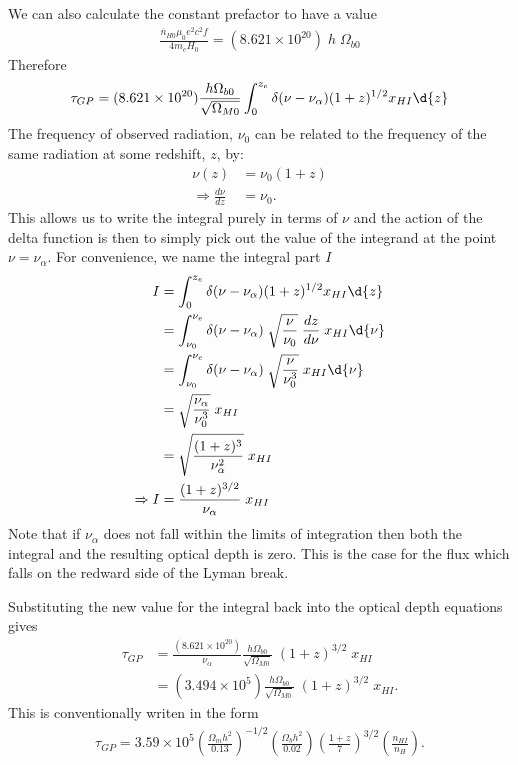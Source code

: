 		We can also calculate the constant prefactor to have a value
		\begin{align}
			\frac{ \overline{n}_{H0} \mu_0 e^2 c^2 f}{4 m_e H_0} = (8.621\times 10^{20} ) \; h \; \Omega_{b0}
		\end{align}
		Therefore
		\begin{align}
			\tau_{GP} = (8.621\times 10^{20} ) \frac{h \Omega_{b0}}{\sqrt{\Omega_{M0}}} \int_0^{z_e} \delta(\nu - \nu_\alpha) (1+z)^{1/2} x_{HI} \d{z}
		\end{align}
		The frequency of observed radiation, $\nu_0$ can be related to the frequency of the same radiation at some redshift, $z$, by:
		\begin{align}
					\nu(z) &= \nu_0(1+z)  \\
			\Rightarrow \frac{d\nu}{dz} &= \nu_0.
		\end{align}
		This allows us to write the integral purely in terms of $\nu$ and the action of the delta function is then to simply pick out the value of the integrand at the point $\nu = \nu_\alpha$. For convenience, we name the integral part $I$
		\begin{align}
			I &=  \int_0^{z_e} \delta(\nu - \nu_\alpha)(1+z)^{1/2} x_{HI} \d{z} \\
			  &=  \int_{\nu_0}^{\nu_e} \delta(\nu - \nu_\alpha) \;  \sqrt{\frac{\nu}{\nu_0}} \; \frac{dz}{d\nu} \; x_{HI} \d{\nu} \\
			  &=  \int_{\nu_0}^{\nu_e} \delta(\nu - \nu_\alpha) \;  \sqrt{\frac{\nu}{\nu_0^3}} \; x_{HI} \d{\nu}\\
			  &=  \sqrt{\frac{\nu_\alpha}{\nu_0^3}} \; x_{HI} \\
			  &=  \sqrt{ \frac{(1+z)^3}{\nu_\alpha^2}}\; x_{HI} \\
			\Rightarrow	I &=  \frac{(1+z)^{3/2}}{\nu_\alpha}\; x_{HI}
		\end{align}
		Note that if $\nu_\alpha$ does not fall within the limits of integration then both the integral and the resulting optical depth is zero. This is the case for the flux which falls on the redward side of the Lyman break.

		Substituting the new value for the integral back into the optical depth equations gives
		\begin{align}
			\tau_{GP} &=  \frac{(8.621\times 10^{20} )}{\nu_\alpha} \frac{h \Omega_{b0}}{\sqrt{\Omega_{M0}}} \; (1+z)^{3/2} \; x_{HI} \\
		       &=  (3.494 \times 10^{5}) \frac{h \Omega_{b0}}{\sqrt{\Omega_{M0}}} \; (1+z)^{3/2} \; x_{HI}.
		\end{align}
		This is conventionally writen in the form
		\begin{align}
			\tau_{GP} = 3.59 \times 10^5 \left ( \frac{\Omega_m h^2}{0.13}\right )^{-1/2}
					\left ( \frac{\Omega_b h^2}{0.02}	\right )
					\left ( \frac{1+z}{7}	\right )^{3/2}
					\left ( \frac{n_{HI}}{n_H}	\right ) .
		\end{align}







